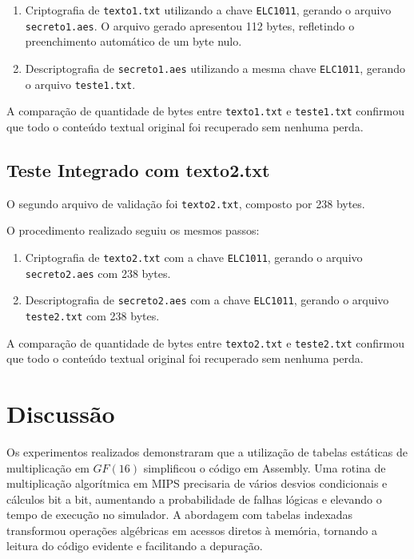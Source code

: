 \documentclass[12pt,a4paper]{article}
\begin{document}
\begin{enumerate}
    \item Criptografia de \texttt{texto1.txt} utilizando a chave \texttt{ELC1011}, gerando o arquivo \texttt{secreto1.aes}. O arquivo gerado apresentou 112 bytes, refletindo o preenchimento automático de um byte nulo.
    \item Descriptografia de \texttt{secreto1.aes} utilizando a mesma chave \texttt{ELC1011}, gerando o arquivo \texttt{teste1.txt}.
\end{enumerate}

A comparação de quantidade de bytes entre \texttt{texto1.txt} e \texttt{teste1.txt} confirmou que todo o conteúdo textual original foi recuperado sem nenhuma perda.

\subsection{Teste Integrado com texto2.txt}

O segundo arquivo de validação foi \texttt{texto2.txt}, composto por 238 bytes.

O procedimento realizado seguiu os mesmos passos:

\begin{enumerate}
    \item Criptografia de \texttt{texto2.txt} com a chave \texttt{ELC1011}, gerando o arquivo \texttt{secreto2.aes} com 238 bytes.
    \item Descriptografia de \texttt{secreto2.aes} com a chave \texttt{ELC1011}, gerando o arquivo \texttt{teste2.txt} com 238 bytes.
\end{enumerate}

A comparação de quantidade de bytes entre \texttt{texto2.txt} e \texttt{teste2.txt} confirmou que todo o conteúdo textual original foi recuperado sem nenhuma perda.

\section{Discussão}

Os experimentos realizados demonstraram que a utilização de tabelas estáticas de multiplicação em $GF(16)$ simplificou o código em Assembly. Uma rotina de multiplicação algorítmica em MIPS precisaria de vários desvios condicionais e cálculos bit a bit, aumentando a probabilidade de falhas lógicas e elevando o tempo de execução no simulador. A abordagem com tabelas indexadas transformou operações algébricas em acessos diretos à memória, tornando a leitura do código evidente e facilitando a depuração.
\end{document}
